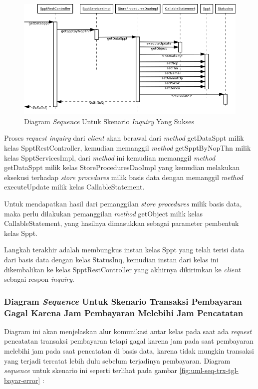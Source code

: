 \documentclass[pdftex,12pt, oneside]{article}
\begin{document}
\begin{figure}[H]
  \centering
  \includegraphics[width=1\textwidth]{./resources/uml/uml-seq-inquiry}
  \caption{Diagram \textit{Sequence} Untuk Skenario \textit{Inquiry} Yang Sukses}
  \label{fig:uml-seq-inquiry}
\end{figure}

Proses \textit{request inquiry} dari \textit{client} akan berawal dari \textit{method} getDataSppt milik kelas SpptRestController, kemudian memanggil \textit{method} getSpptByNopThn milik kelas SpptServicesImpl, dari \textit{method} ini kemudian memanggil \textit{method} getDataSppt milik kelas StoreProceduresDaoImpl yang kemudian melakukan eksekusi terhadap \textit{store procedures} milik basis data dengan memanggil \textit{method} executeUpdate milik kelas CallableStatement.

Untuk mendapatkan hasil dari pemanggilan \textit{store procedures} milik basis data, maka perlu dilakukan pemanggilan \textit{method} getObject milik kelas CallableStatement, yang hasilnya dimasukkan sebagai parameter pembentuk kelas Sppt.

Langkah terakhir adalah membungkus instan kelas Sppt yang telah terisi data dari basis data dengan kelas StatusInq, kemudian instan dari kelas ini dikembalikan ke kelas SpptRestController yang akhirnya dikirimkan ke \textit{client} sebagai respon \textit{inquiry}.

\subsubsection{Diagram \textit{Sequence} Untuk Skenario Transaksi Pembayaran Gagal Karena Jam Pembayaran Melebihi Jam Pencatatan}

Diagram ini akan menjelaskan alur komunikasi antar kelas pada saat ada \textit{request} pencatatan transaksi pembayaran tetapi gagal karena jam pada saat pembayaran melebihi jam pada saat pencatatan di basis data, karena tidak mungkin transaksi yang terjadi tercatat lebih dulu sebelum terjadinya pembayaran. Diagram \textit{sequence} untuk skenario ini seperti terlihat pada gambar \ref{fig:uml-seq-trx-tgl-bayar-error} :
\end{document}
